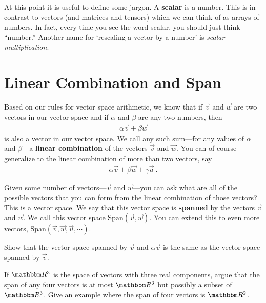 At this point it is useful to define some jargon. A \textbf{scalar} is a number. This is in contrast to vectors (and matrices and tensors) which we can think of as arrays of numbers. In fact, every time you see the word scalar, you should just think ``number.'' Another name for `rescaling a vector by a number' is \emph{scalar multiplication}.

\section{Linear Combination and Span}
\label{sec:linear:combination:and:span}

Based on our rules for vector space arithmetic, we know that if $\vec{v}$ and $\vec{w}$ are two vectors in our vector space and if $\alpha$ and $\beta$ are any two numbers, then
\begin{align}
    \alpha\vec{v} + \beta\vec{w} 
\end{align}
is also a vector in our vector space. We call any such sum---for any values of $\alpha$ and $\beta$---a \textbf{linear combination} of the vectors $\vec{v}$ and $\vec{w}$. You can of course generalize to the linear combination of more than two vectors, say
\begin{align}
    \alpha\vec{v} + \beta\vec{w} + \gamma\vec{u} \ .
\end{align}

Given some number of vectors---$\vec{v}$ and $\vec{w}$---you can ask what are all of the possible vectors that you can form from the linear combination of those vectors? This is a vector space. We say that this vector space is \textbf{spanned} by the vectors $\vec{v}$ and $\vec{w}$. We call this vector space $\text{Span}(\vec{v},\vec{w})$. You can extend this to even more vectors, $\text{Span}(\vec{v}, \vec{w}, \vec{u},\cdots)$.

\begin{exercise}
Show that the vector space spanned by $\vec{v}$ and $\alpha\vec{v}$ is the same as the vector space spanned by $\vec{v}$.
\end{exercise}

\begin{exercise}
If $\RR ^3$ is the space of vectors with three real components, argue that the span of any four vectors is at most $\RR ^3$ but possibly a subset of $\RR ^3$. Give an example where the span of four vectors is $\RR ^2$. 
\end{exercise}


